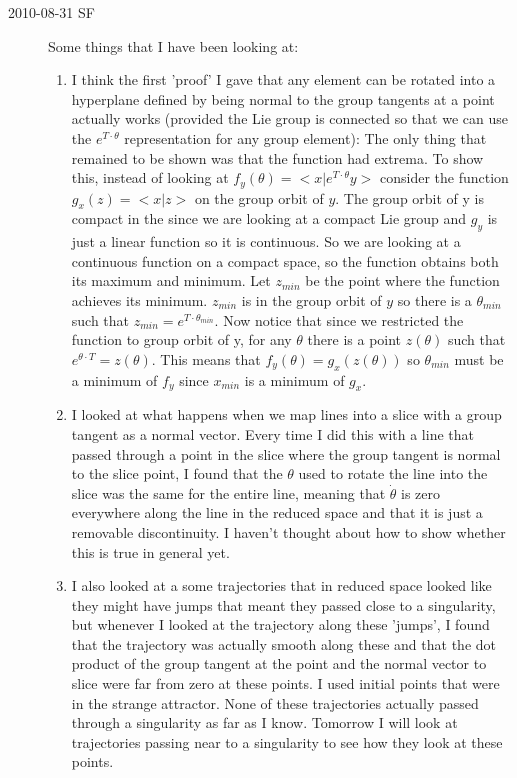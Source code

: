 \begin{description}
\item[2010-08-31 SF]
Some things that I have been looking at:

\begin{enumerate}
\item
I think the first 'proof' I gave that any element can be rotated into a hyperplane defined by being normal to the group tangents at a point actually works (provided the Lie group is connected so that we can use the $e^{T \cdot \theta}$ representation for any group element): The only thing that remained to be shown was that the function had extrema. To show this, instead of looking at $f_y(\theta)=<x|e^{T \cdot \theta} y>$ consider the function $g_x(z)=<x|z>$ on the group orbit of $y$. The group orbit of y is compact in the {\statesp} since we are looking at a compact Lie group and $g_y$ is just a linear function so it is continuous. So we are looking at a continuous function on a compact space, so the function obtains both its maximum and minimum. Let $z_{min}$ be the point where the function achieves its minimum. $z_{min}$ is in the group orbit of $y$ so there is a $\theta_{min}$ such that $z_{min}=e^{T \cdot \theta_{min}}$. Now notice that since we restricted the function to group orbit of y, for any $\theta$ there is a point $z(\theta)$ such that $e^{\theta \cdot T}=z(\theta)$. This means that $f_y(\theta)=g_x(z(\theta))$ so $\theta_{min}$ must be a minimum of $f_y$ since $x_{min}$ is a minimum of $g_x$.

\item
I looked at what happens when we map lines into a slice with a group tangent as a normal vector. Every time I did this with a line that passed through a point in the slice where the group tangent is normal to the slice point, I found that the $\theta$ used to rotate the line into the slice was the same for the entire line, meaning that $\dot \theta$ is zero everywhere along the line in the reduced space and that it is just a removable discontinuity. I haven't thought about how to show whether this is true in general yet.

\item
I also looked at a some trajectories that in reduced space looked like they might have jumps that meant they passed close to a singularity, but whenever I looked at the trajectory along these 'jumps', I found that the trajectory was actually smooth along these and that the dot product of the group tangent at the point and the normal vector to slice were far from zero at these points. I used initial points that were in the strange attractor. None of these trajectories actually passed through a singularity as far as I know. Tomorrow I will look at trajectories passing near to a singularity to see how they look at these points.


\end{enumerate}
\end{description}
